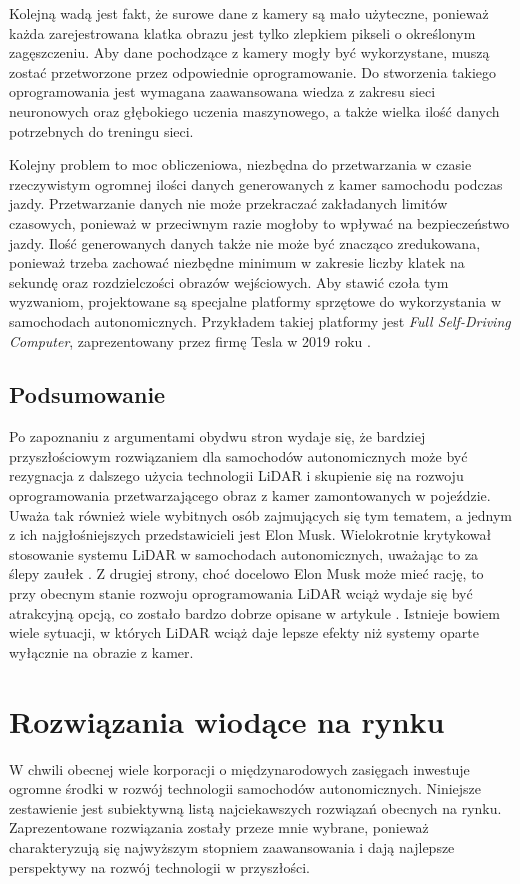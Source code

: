 Kolejną wadą jest fakt, że surowe dane z kamery są mało użyteczne, ponieważ każda zarejestrowana klatka obrazu jest tylko zlepkiem pikseli o określonym zagęszczeniu. Aby dane pochodzące z kamery mogły być wykorzystane, muszą zostać przetworzone przez odpowiednie oprogramowanie. Do stworzenia takiego oprogramowania jest wymagana zaawansowana wiedza z zakresu sieci neuronowych oraz głębokiego uczenia maszynowego, a także wielka ilość danych potrzebnych do treningu sieci.

Kolejny problem to moc obliczeniowa, niezbędna do przetwarzania w czasie rzeczywistym ogromnej ilości danych generowanych z kamer samochodu podczas jazdy. Przetwarzanie danych nie może przekraczać zakładanych limitów czasowych, ponieważ w przeciwnym razie mogłoby to wpływać na bezpieczeństwo jazdy. Ilość generowanych danych także nie może być znacząco zredukowana, ponieważ trzeba zachować niezbędne minimum w zakresie liczby klatek na sekundę oraz rozdzielczości obrazów wejściowych. Aby stawić czoła tym wyzwaniom, projektowane są specjalne platformy sprzętowe do wykorzystania w samochodach autonomicznych. Przykładem takiej platformy jest \textit{Full Self-Driving Computer}, zaprezentowany przez firmę Tesla w 2019 roku \cite{autopilotReview:fsdComputer}.

\subsection{Podsumowanie}
Po zapoznaniu z argumentami obydwu stron wydaje się, że bardziej przyszłościowym rozwiązaniem dla samochodów autonomicznych może być rezygnacja z dalszego użycia technologii LiDAR i skupienie się na rozwoju oprogramowania przetwarzającego obraz z kamer zamontowanych w pojeździe. Uważa tak również wiele wybitnych osób zajmujących się tym tematem, a jednym z ich najgłośniejszych przedstawicieli jest Elon Musk. Wielokrotnie krytykował stosowanie systemu LiDAR w samochodach autonomicznych, uważając to za ślepy zaułek \cite{burns:elonMuskLidar}. Z drugiej strony, choć docelowo Elon Musk może mieć rację, to przy obecnym stanie rozwoju oprogramowania LiDAR wciąż wydaje się być atrakcyjną opcją, co zostało bardzo dobrze opisane w artykule \cite{forbes:muskWarOnLidar}. Istnieje bowiem wiele sytuacji, w których LiDAR wciąż daje lepsze efekty niż systemy oparte wyłącznie na obrazie z kamer.

\section{Rozwiązania wiodące na rynku}
W chwili obecnej wiele korporacji o międzynarodowych zasięgach inwestuje ogromne środki w rozwój technologii samochodów autonomicznych. Niniejsze zestawienie jest subiektywną listą najciekawszych rozwiązań obecnych na rynku. Zaprezentowane rozwiązania zostały przeze mnie wybrane, ponieważ charakteryzują się najwyższym stopniem zaawansowania i dają najlepsze perspektywy na rozwój technologii w przyszłości.

